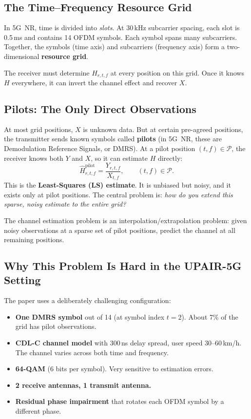 \documentclass[11pt,a4paper]{article}
\begin{document}
	\subsection{The Time--Frequency Resource Grid}
	
	In 5G~NR, time is divided into \emph{slots}.  At 30\,kHz subcarrier spacing, each slot is 0.5\,ms and contains 14 OFDM symbols.  Each symbol spans many subcarriers.  Together, the symbols (time axis) and subcarriers (frequency axis) form a two-dimensional \textbf{resource grid}.
	
	The receiver must determine $H_{r,t,f}$ at every position on this grid.  Once it knows $H$ everywhere, it can invert the channel effect and recover $X$.
	
	\subsection{Pilots: The Only Direct Observations}
	
	At most grid positions, $X$ is unknown data.  But at certain pre-agreed positions, the transmitter sends known symbols called \textbf{pilots} (in 5G~NR, these are Demodulation Reference Signals, or DMRS).  At a pilot position $(t,f) \in \mathcal{P}$, the receiver knows both $Y$ and $X$, so it can estimate $H$ directly:
	\begin{equation}
		\widehat{H}^{\mathrm{pilot}}_{r,t,f} = \frac{Y_{r,t,f}}{X_{t,f}}, \qquad (t,f) \in \mathcal{P}.
		\label{eq:ls_pilot}
	\end{equation}
	This is the \textbf{Least-Squares (LS) estimate}.  It is unbiased but noisy, and it exists only at pilot positions.  The central problem is: \emph{how do you extend this sparse, noisy estimate to the entire grid?}
	
	\begin{keyidea}
		The channel estimation problem is an interpolation/extrapolation problem: given noisy observations at a sparse set of pilot positions, predict the channel at all remaining positions.
	\end{keyidea}
	
	\subsection{Why This Problem Is Hard in the UPAIR-5G Setting}
	
	The paper uses a deliberately challenging configuration:
	\begin{itemize}[nosep]
		\item \textbf{One DMRS symbol} out of 14 (at symbol index $t=2$).  About 7\% of the grid has pilot observations.
		\item \textbf{CDL-C channel model} with 300\,ns delay spread, user speed 30--60\,km/h.  The channel varies across both time and frequency.
		\item \textbf{64-QAM} (6 bits per symbol).  Very sensitive to estimation errors.
		\item \textbf{2 receive antennas, 1 transmit antenna.}
		\item \textbf{Residual phase impairment} that rotates each OFDM symbol by a different phase.
	\end{itemize}
	
\end{document}

